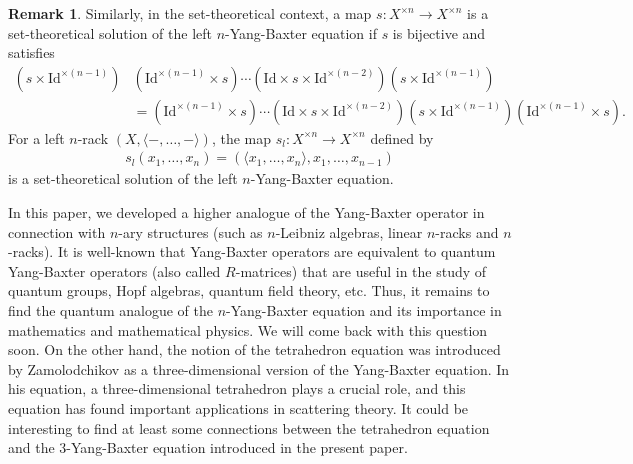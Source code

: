 \documentclass[a4paper,reqno,10pt]{amsart}
\theoremstyle{plain}
\theoremstyle{definition}
\newtheorem{remark}[thm]{Remark}
\theoremstyle{remark}
\begin{document}
\begin{remark}
\medskip

Similarly, in the set-theoretical context, a map $s: X^{\times n} \rightarrow X^{\times n}$ is a set-theoretical solution of the left $n$-Yang-Baxter equation if $s$ is bijective and satisfies
\begin{align*}
     (s \times \mathrm{Id}^{\times (n-1)}) & ( \mathrm{Id}^{\times (n-1)} \times s) \cdots (\mathrm{Id} \times s \times \mathrm{Id}^{\times (n-2)})  (s \times \mathrm{Id}^{\times (n-1)})  \\
     &= ( \mathrm{Id}^{\times (n-1)} \times s)  \cdots  (\mathrm{Id} \times s \times \mathrm{Id}^{\times (n-2)}) (s \times \mathrm{Id}^{\times (n-1)}) ( \mathrm{Id}^{\times (n-1)} \times s).
\end{align*}
For a left $n$-rack $(X, \langle - , \ldots , - \rangle)$, the map $s_l : X^{\times n} \rightarrow X^{\times n}$ defined by
\begin{align*}
    s_l (x_1, \ldots, x_n) = (\langle x_1, \ldots, x_n \rangle, x_1, \ldots, x_{n-1})
\end{align*}
is a set-theoretical solution of the left $n$-Yang-Baxter equation.
\end{remark}
    




  






In this paper, we developed a higher analogue of the Yang-Baxter operator in connection with $n$-ary structures (such as $n$-Leibniz algebras, linear $n$-racks and $n$-racks). It is well-known that Yang-Baxter operators are equivalent to quantum Yang-Baxter operators (also called $R$-matrices) that are useful in the study of quantum groups, Hopf algebras, quantum field theory, etc. Thus, it remains to find the quantum analogue of the $n$-Yang-Baxter equation and its importance in mathematics and mathematical physics. We will come back with this question soon. On the other hand, the notion of the tetrahedron equation was introduced by Zamolodchikov \cite{zamo1,zamo2} as a three-dimensional version of the Yang-Baxter equation. In his equation, a three-dimensional tetrahedron plays a crucial role, and this equation has found important applications in scattering theory. It could be interesting to find at least some connections between the tetrahedron equation and the $3$-Yang-Baxter equation introduced in the present paper.
\end{document}

